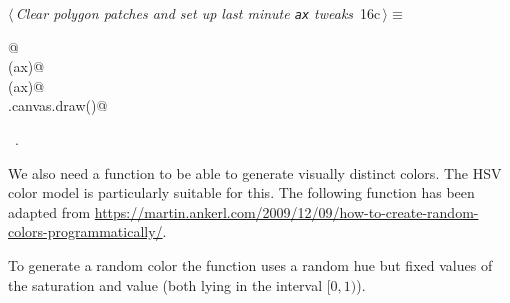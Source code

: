 \documentclass[11.5pt]{report}
\begin{document}
\begin{flushleft} \small
\begin{minipage}{\linewidth}\label{scrap10}\raggedright\small
{} $\langle\,${\itshape Clear polygon patches and set up last minute \verb|ax| tweaks}\nobreak\ {\footnotesize {16c}}$\,\rangle\equiv$
\vspace{-1ex}
\begin{list}{}{} \item
\mbox{}\verb@   @\\
\mbox{}\verb@clearAxPolygonPatches(ax)@\\
\mbox{}\verb@applyAxCorrection(ax)@\\
\mbox{}\verb@fig.canvas.draw()@\\
\mbox{}\verb@@{\NWsep}
\end{list}
\vspace{-1.5ex}
\footnotesize
\begin{list}{}{\setlength{\itemsep}{-\parsep}\setlength{\itemindent}{-\leftmargin}}
\item \NWtxtMacroRefIn\ .

\item{}
\end{list}
\end{minipage}\vspace{4ex}
\end{flushleft}

\newchunk We also need a function to be able to generate visually distinct colors. 
The HSV color model is particularly suitable for this. The following function has been 
adapted from \url{https://martin.ankerl.com/2009/12/09/how-to-create-random-colors-programmatically/}. 

To generate a random color the function uses a random hue but fixed values of the saturation 
and value (both lying in the interval $[0,1)$). 
 
\end{document}
